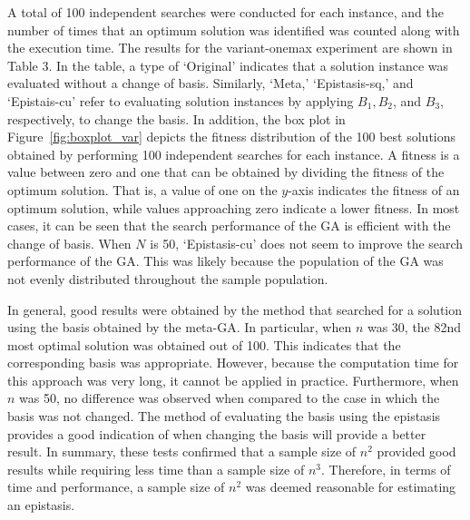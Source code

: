 A total of 100 independent searches were conducted for each instance, and the number of times that an optimum solution was identified was counted along with the execution time. The results for the variant-onemax experiment are shown in Table 3. In the table, a type of `Original' indicates that a solution instance was evaluated without a change of basis. Similarly, `Meta,' `Epistasis-sq,' and `Epistais-cu' refer to evaluating solution instances by applying $ B_1,B_2 $, and $ B_3 $, respectively, to change the basis. In addition, the box plot in Figure~\ref{fig:boxplot_var} depicts the fitness distribution of the 100 best solutions obtained by performing 100 independent searches for each instance. A fitness is a value between zero and one that can be obtained by dividing the fitness of the optimum solution. That is, a value of one on the $ y $-axis indicates the fitness of an optimum solution, while values approaching zero indicate a lower fitness. In most cases, it can be seen that the search performance of the GA is efficient with the change of basis. When $ N $ is 50, `Epistasis-cu' does not seem to improve the search performance of the GA. This was likely because the population of the GA was not evenly distributed throughout the sample population.

In general, good results were obtained by the method that searched for a solution using the basis obtained by the meta-GA. In particular, when $ n $ was 30, the 82nd most optimal solution was obtained out of 100. This indicates that the corresponding basis was appropriate. However, because the computation time for this approach was very long, it cannot be applied in practice. Furthermore, when $ n $ was 50, no difference was observed when compared to the case in which the basis was not changed. The method of evaluating the basis using the epistasis provides a good indication of when changing the basis will provide a better result. In summary, these tests confirmed that a sample size of $ n^2 $ provided good results while requiring less time than a sample size of $ n^3 $. Therefore, in terms of time and performance, a sample size of $ n^2 $ was deemed reasonable for estimating an epistasis.


